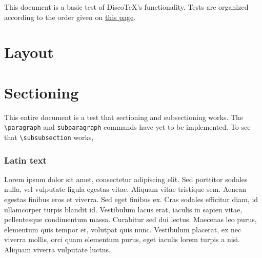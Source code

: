 \documentclass[11pt]{article}
\newcommand{\DiscoTeX}[1]{Disco\TeX}
\newcommand{\ifdisco}[2]{#2}
\begin{document}
\tableofcontents
This document is a basic test of \DiscoTeX{}'s functionality.
Tests are organized according to the order given on \href{ftp://ftp.tex.ac.uk/tex-archive/info/latex2e-help-texinfo/latex2e.html}{this page}.
\section{}%
\section{}%
\section{}%
\section{}%
\section{}%
\section{Layout} %
\section{Sectioning}
This entire \ifdisco{page}{document} is a test that sectioning and subsectioning works.
The \verb|\paragraph| and \verb|subparagraph| commands have yet to be implemented.
To see that \verb|\subsubsection| works,

\subsubsection{Latin text}
Lorem ipsum dolor sit amet, consectetur adipiscing elit. Sed porttitor sodales nulla, vel vulputate ligula egestas vitae. Aliquam vitae tristique sem. Aenean egestas finibus eros et viverra. Sed eget finibus ex. Cras sodales efficitur diam, id ullamcorper turpis blandit id. Vestibulum lacus erat, iaculis in sapien vitae, pellentesque condimentum massa. Curabitur sed dui lectus. Maecenas leo purus, elementum quis tempor et, volutpat quis nunc. Vestibulum placerat, ex nec viverra mollis, orci quam elementum purus, eget iaculis lorem turpis a nisi. Aliquam viverra vulputate luctus.
\end{document}
